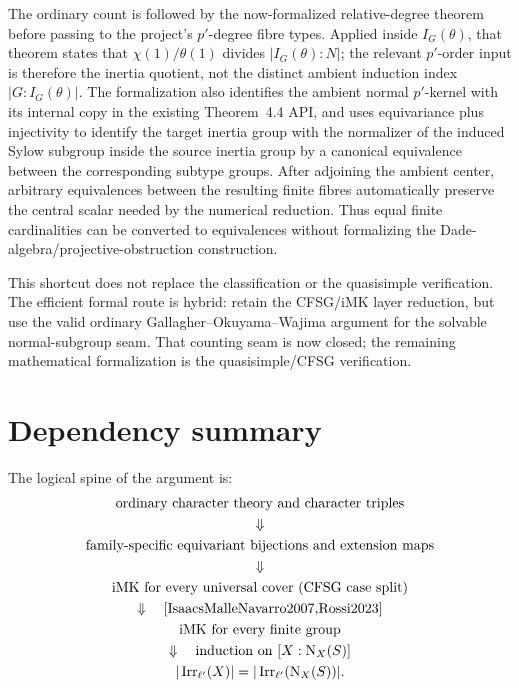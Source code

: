 \documentclass[11pt]{article}
\newcommand{\Irr}{\operatorname{Irr}}
\newcommand{\Norm}{\operatorname{N}}
\newcommand{\IMK}{\mathrm{iMK}}
\begin{document}
The ordinary count is followed by the now-formalized relative-degree
theorem \cite[Theorem~5.12]{Navarro2018} before passing to the project's
\(p'\)-degree fibre types.  Applied inside \(I_G(\theta)\), that theorem
states that \(\chi(1)/\theta(1)\) divides
\(|I_G(\theta):N|\); the relevant \(p'\)-order input is therefore the
inertia quotient, not the distinct ambient induction index
\(|G:I_G(\theta)|\).  The formalization also identifies the ambient normal
\(p'\)-kernel with its internal copy in the existing Theorem~4.4 API, and
uses equivariance plus injectivity to identify the target inertia group
with the normalizer of the induced Sylow subgroup inside the source
inertia group by a canonical equivalence between the corresponding
subtype groups.
After adjoining the ambient center, arbitrary equivalences between the
resulting finite fibres automatically preserve the central scalar needed
by the numerical reduction.  Thus equal finite cardinalities can be
converted to equivalences without formalizing the
Dade-algebra/projective-obstruction construction.

This shortcut does not replace the classification or the quasisimple
verification.  The efficient formal route is hybrid: retain the
CFSG/\(\IMK\) layer reduction, but use the valid ordinary
Gallagher--Okuyama--Wajima argument for the solvable normal-subgroup seam.
That counting seam is now closed; the remaining mathematical
formalization is the quasisimple/CFSG verification.

\section{Dependency summary}

The logical spine of the argument is:
\[
\begin{gathered}
\text{ordinary character theory and character triples}\\
\Downarrow\\
\text{family-specific equivariant bijections and extension maps}\\
\Downarrow\\
\IMK\text{ for every universal cover (CFSG case split)}\\
\Downarrow\quad\text{\cite{IsaacsMalleNavarro2007,Rossi2023}}\\
\IMK\text{ for every finite group}\\
\Downarrow\quad\text{induction on }[X:\Norm_X(S)]\\
|\Irr_{\ell'}(X)|
=
|\Irr_{\ell'}(\Norm_X(S))|.
\end{gathered}
\]

\begingroup
\footnotesize


\endgroup
\end{document}
